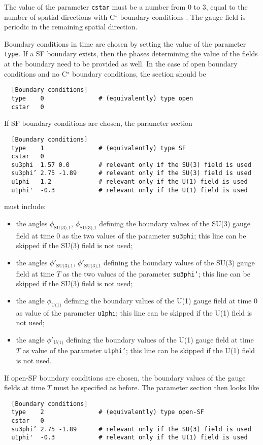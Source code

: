\documentclass[11pt,fleqn]{article}
\begin{document}
The value of the parameter \texttt{cstar} must be a number from 0 to 3, equal to
the number of spatial directions with C$^\star$ boundary conditions
\cite{cstar}. The gauge field is periodic in the remaining spatial direction.

Boundary conditions in time \cite{gauge_action} are chosen by setting the value
of the parameter \texttt{type}. If a SF boundary exists, then the phases
determining the value of the fields at the boundary need to be provided as well.
In the case of open boundary conditions and no C$^\star$ boundary conditions,
the section should be
%
\begin{verbatim}
  [Boundary conditions]
  type    0               # (equivalently) type open
  cstar   0
\end{verbatim}
%
If SF boundary conditions are chosen, the parameter section
%
\begin{verbatim}
  [Boundary conditions]
  type    1               # (equivalently) type SF
  cstar   0
  su3phi  1.57 0.0        # relevant only if the SU(3) field is used
  su3phi’ 2.75 -1.89      # relevant only if the SU(3) field is used
  u1phi   1.2             # relevant only if the U(1) field is used
  u1phi'  -0.3            # relevant only if the U(1) field is used
\end{verbatim}
%
must include:
\begin{itemize}
  \item the angles $\phi_\text{SU(3),1}$, $\phi_\text{SU(3),1}$ defining the
  boundary values of the SU(3) gauge field at time $0$ as the two values of the
  parameter \texttt{su3phi}; this line can be skipped if the SU(3) field is not
  used;
  \item the angles $\phi'_\text{SU(3),1}$, $\phi'_\text{SU(3),1}$ defining the
  boundary values of the SU(3) gauge field at time $T$ as the two values of the
  parameter \texttt{su3phi'}; this line can be skipped if the SU(3) field is not
  used;
  \item the angle $\phi_\text{U(1)}$ defining the boundary values of the U(1)
  gauge field at time $0$ as value of the parameter \texttt{u1phi}; this line
  can be skipped if the U(1) field is not used;
  \item the angle $\phi'_\text{U(1)}$ defining the boundary values of the U(1)
  gauge field at time $T$ as value of the parameter \texttt{u1phi'}; this line
  can be skipped if the U(1) field is not used.
\end{itemize}
%
If open-SF boundary conditions are chosen, the boundary values of the gauge
fields at time $T$ must be specified as before. The
parameter section then looks like
%
\begin{verbatim}
  [Boundary conditions]
  type    2               # (equivalently) type open-SF
  cstar   0
  su3phi’ 2.75 -1.89      # relevant only if the SU(3) field is used
  u1phi'  -0.3            # relevant only if the U(1) field is used
\end{verbatim}
%
\end{document}
